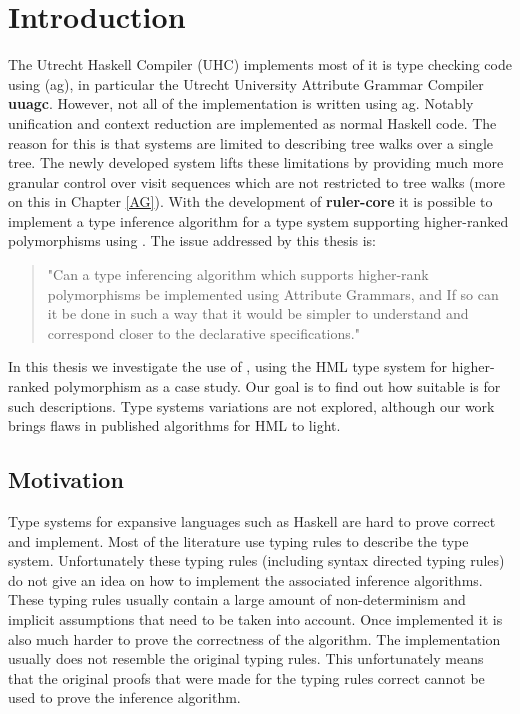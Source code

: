 \chapter{Introduction}
The Utrecht Haskell Compiler (UHC\cite{UHC}) implements most of it is type checking code using \ags (ag), in particular the Utrecht University Attribute Grammar Compiler \textbf{uuagc}\cite{uuagc}. However, not all of the implementation is written using ag. Notably unification and context reduction are implemented as normal Haskell code. The reason for this is that \ag systems are limited to describing tree walks over a single tree. The newly developed \rcore system lifts these limitations by providing much more granular control over visit sequences which are not restricted to tree walks (more on this in Chapter \ref{AG}). With the development of \textbf{ruler-core}\cite{ruler-front} it is possible to implement a type inference algorithm for a type system supporting higher-ranked polymorphisms using \ags. The issue addressed by this thesis is:

\begin{quotation}
"Can a type inferencing algorithm which supports higher-rank polymorphisms be implemented using Attribute Grammars, and If so can it be done in such a way that it would be simpler to understand and correspond closer to the declarative specifications."
\end{quotation}

In this thesis we investigate the use of \rcore, using the HML type system for higher-ranked polymorphism as a case study. Our goal is to find out how suitable \rcore is for such descriptions. Type systems variations are not explored, although our work brings flaws in published algorithms for HML to light.

\section{Motivation}
Type systems for expansive languages such as Haskell are hard to prove correct and implement. Most of the literature use typing rules to describe the type system. Unfortunately these typing rules (including syntax directed typing rules) do not give an idea on how to implement the associated inference algorithms. These typing rules usually contain a large amount of non-determinism and implicit assumptions that need to be taken into account.
Once implemented it is also much harder to prove the correctness of the algorithm. The implementation usually does not resemble the original typing rules. This unfortunately means that the original proofs that were made for the typing rules correct cannot be used to prove the inference algorithm.

